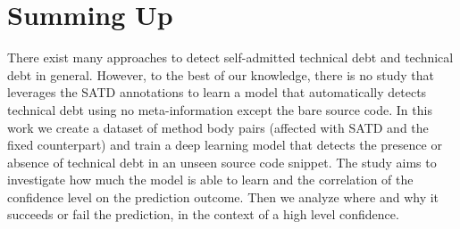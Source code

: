 \section{Summing Up}

There exist many approaches to detect self-admitted technical debt and technical debt in general. However, to the best of our knowledge, there is no study that leverages the SATD annotations to learn a model that automatically detects technical debt using no meta-information except the bare source code.
In this work we create a dataset of method body pairs (affected with SATD and the fixed counterpart) and train a deep learning model that detects the presence or absence of technical debt in an unseen source code snippet. The study aims to investigate how much the model is able to learn and the correlation of the confidence level on the prediction outcome. Then we analyze where and why it succeeds or fail the prediction, in the context of a high level confidence.

